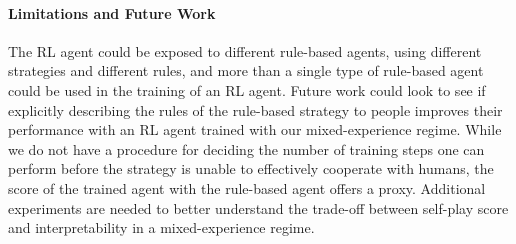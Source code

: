 \documentclass[letterpaper]{article} %
\begin{document}
\paragraph{Limitations and Future Work}





The RL agent could be exposed to different rule-based agents, using different strategies and different rules, and more than a single type of rule-based agent could be used in the training of an RL agent. 
Future work could look to see if explicitly describing  the rules of the rule-based strategy to people  improves their performance with an RL agent trained with our mixed-experience regime. 
While we do not have a procedure for deciding the number of training steps one can perform before the strategy is unable to effectively cooperate with humans, the score of the trained agent with the rule-based agent offers a proxy. %
Additional experiments are needed to better understand the trade-off between self-play score and interpretability in a mixed-experience regime. 


%
%
%
%

\end{document}
